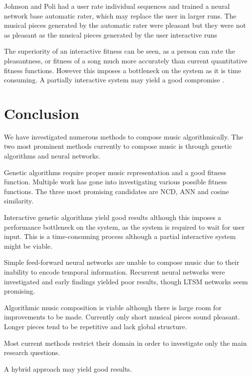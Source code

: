Johnson and Poli had a user rate individual sequences and trained a neural network base automatic rater, which may replace the user in larger runs. The musical pieces generated by the automatic rater were pleasant but they were not as pleasant as the musical pieces generated by the user interactive runs \cite{Johanson1998}

The superiority of an interactive fitness can be seen, as a person can rate the pleasantness, or fitness of a song much more accurately than current quantitative fitness functions. However this imposes a bottleneck on the system as it is time consuming. A partially interactive system may yield a good compromise \cite{Biles1996}.


\chapter{Conclusion}
We have investigated numerous methods to compose music algorithmically. The two most prominent methods currently to compose music is through genetic algorithms and neural networks.

Genetic algorithms require proper music representation and a good fitness function. Multiple work has gone into investigating various possible fitness functions. The three most promising candidates are \ac{NCD}, \ac{ANN} and cosine similarity.

Interactive genetic algorithms yield good results although this imposes a performance bottleneck on the system, as the system is required to wait for user input. This is a time-consuming process although a partial interactive system might be viable.

Simple feed-forward neural networks are unable to compose music due to their inability to encode temporal information. Recurrent neural networks were investigated and early findings yielded poor results, though LTSM networks seem promising.

Algorithmic music composition is viable although there is large room for improvements to be made. Currently only short musical pieces sound pleasant. Longer pieces tend to be repetitive and lack global structure. 

Most current methods restrict their domain in order to investigate only the main research questions. 

A hybrid approach may yield good results. 



